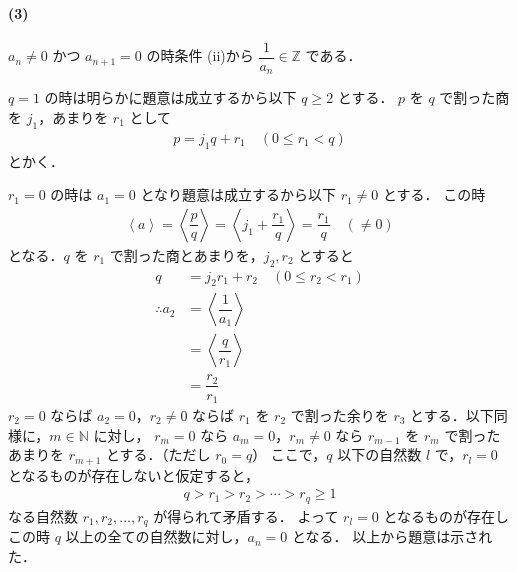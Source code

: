 \documentclass[../../main.tex]{subfiles}
\begin{document}
\paragraph{(3)}

$a_n \neq 0$ かつ $a_{n+1}=0$ の時条件 (ii)から $\dfrac{1}{a_n} \in \mathbb{Z}$ である．

$q=1$ の時は明らかに題意は成立するから以下 $q \ge 2$ とする．
$p$ を $q$ で割った商を $j_1$，あまりを $r_1$ として
\begin{align}
  p = j_1 q + r_1 \quad (0 \le r_1 < q) \label{eq:5}
\end{align}
とかく．

$r_1=0$ の時は $a_1 = 0$ となり題意は成立するから以下 $r_1 \neq 0$ とする．
この時
\begin{align}
  \left\langle a \right\rangle
  = \left\langle \dfrac{p}{q} \right\rangle
  = \left\langle j_1 + \dfrac{r_1}{q} \right\rangle
  = \dfrac{r_1}{q} \quad (\neq 0)
\end{align}
となる．$q$ を $r_1$ で割った商とあまりを，$j_2, r_2$ とすると
\begin{align}
  q
  &= j_2 r_1 + r_2 \quad (0 \le r_2 < r_1) \\
  \therefore
  a_2
  &= \left\langle \dfrac{1}{a_1} \right\rangle \\
  &= \left\langle \dfrac{q}{r_1} \right\rangle \\
  &= \dfrac{r_2}{r_1}
\end{align}
$r_2=0$ ならば $a_2=0$，$r_2 \neq 0$ ならば $r_1$ を $r_2$ で割った余りを $r_3$ とする．以下同様に，$m \in \mathbb{N}$ に対し，
$r_m = 0$ なら $a_m = 0$，$r_m \neq 0$ なら $r_{m-1}$ を $r_m$ で割ったあまりを $r_{m+1}$ とする．（ただし $r_0 = q$）
ここで，$q$ 以下の自然数 $l$ で，$r_l = 0$ となるものが存在しないと仮定すると，
\begin{align}
  q > r_1 > r_2 > \cdots > r_q \ge 1
\end{align}
なる自然数 $r_1, r_2, \dots, r_q$ が得られて矛盾する．
よって $r_l = 0$ となるものが存在しこの時 $q$ 以上の全ての自然数に対し，$a_n = 0$ となる．
以上から題意は示された．
\end{document}
